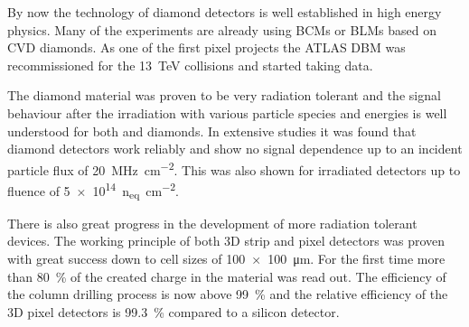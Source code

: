 By now the technology of diamond detectors is well established in high energy physics. Many of the experiments are already using \acp{BCM} or \acp{BLM} based on \ac{CVD} diamonds. As one of the first pixel projects the ATLAS \ac{DBM}  was recommissioned for the \SI{13}{\tera\electronvolt} collisions and started taking data.\par
The diamond material was proven to be very radiation tolerant and the signal behaviour after the irradiation with various particle species and energies is well understood for both \sccvd and \pcvd diamonds. In extensive studies it was found that \pcvd diamond detectors work reliably and show no signal dependence up to an incident particle flux of \SI{20}{\mega\hertz\per\centi\meter^2}. This was also shown for irradiated detectors up to fluence of \SI{5e14}{n_{eq}\per \centi\meter^2}.\par
There is also great progress in the development of more radiation tolerant devices. The working principle of both 3D strip and pixel detectors was proven with great success down to cell sizes of \SI{100x100}{\micro\meter}. For the first time more than \SI{80}{\%} of the created charge in the material was read out. The efficiency of the column drilling process is now above \SI{99}{\%} and the relative efficiency of the 3D pixel detectors is \SI{99.3}{\%} compared to a silicon detector.